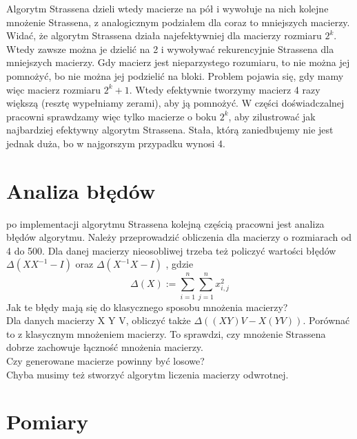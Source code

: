 \documentclass[paper=a4, fontsize=11pt]{scrartcl} %
\numberwithin{equation}{section} %
\numberwithin{figure}{section} %
\numberwithin{table}{section} %
\begin{document}
Algorytm Strassena dzieli wtedy macierze na pół i wywołuje na nich kolejne mnożenie Strassena, z analogicznym podziałem dla coraz to mniejszych macierzy. \\

Widać, że algorytm Strassena działa najefektywniej dla macierzy rozmiaru 
${2^k}$. Wtedy zawsze można je dzielić na 2 i wywoływać rekurencyjnie Strassena dla mniejszych macierzy. Gdy macierz jest nieparzystego rozumiaru, to nie można jej pomnożyć, bo nie można jej podzielić na bloki. Problem pojawia się, gdy mamy więc macierz rozmiaru 
${2^k+1}$. Wtedy efektywnie tworzymy macierz 4 razy większą (resztę wypełniamy zerami), aby ją pomnożyć.
W części doświadczalnej pracowni sprawdzamy więc tylko macierze o boku ${2^k}$, aby zilustrować jak najbardziej efektywny algorytm Strassena.
Stała, którą zaniedbujemy nie jest jednak duża, bo w najgorszym przypadku wynosi 4.


\section{Analiza błędów}
po implementacji algorytmu Strassena kolejną częścią pracowni jest analiza błędów algorytmu.
Należy przeprowadzić obliczenia dla macierzy o rozmiarach od 4 do 500. Dla danej macierzy nieosobliwej trzeba też policzyć wartości błędów 
$\Delta(X X^{-1} - I)$ oraz $\Delta(X^{-1}X - I)$ , gdzie 
$${\Delta(X) := \sum_{i=1}^n \sum_{j=1}^n x_{i,j}^2 }$$ 
Jak te błędy mają się do klasycznego sposobu mnożenia macierzy?\\




Dla danych macierzy X Y V, obliczyć także ${\Delta((X Y)V - X(Y V))}$. Porównać to z klasycznym mnożeniem macierzy. To sprawdzi, czy mnożenie Strassena dobrze zachowuje łączność mnożenia macierzy.\\

Czy generowane macierze powinny być losowe?\\
Chyba musimy też stworzyć algorytm liczenia macierzy odwrotnej.

\section{Pomiary}
\end{document}

